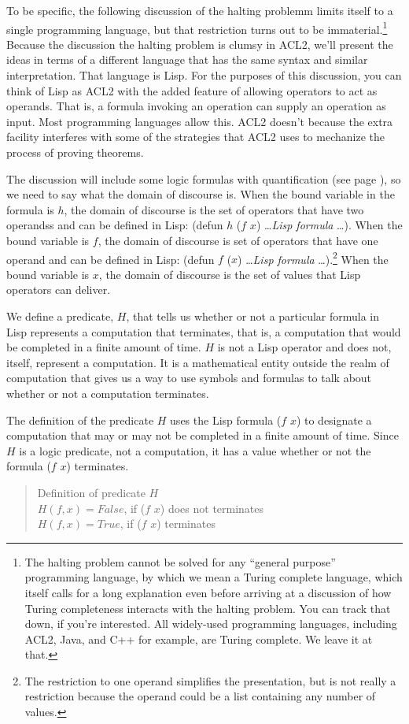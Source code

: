 To be specific, the following discussion of the halting problemm
limits itself to a single programming language, but
that restriction turns out to be immaterial.\footnote{The
halting problem cannot be solved
for any ``general purpose'' programming language,
by which we mean a Turing complete language,
which itself calls for a long explanation even
before arriving at a discussion of how Turing completeness
interacts with the halting problem.
You can track that down, if you're interested.
All widely-used programming languages,
including ACL2, Java, and C++ for example, are Turing complete.
We leave it at that.}
Because the discussion the halting problem is clumsy in ACL2,
we'll present the ideas in terms of a different
language that has the same syntax
and similar interpretation. That language is Lisp.
For the purposes of this discussion,
you can think of Lisp as ACL2 with the added feature
of allowing operators to act as operands.
That is, a formula invoking an operation can supply
an operation as input.
Most programming languages allow this.
ACL2 doesn't because the extra facility
interferes with some of the strategies that ACL2 uses
to mechanize the process of proving theorems.

The discussion will include some logic formulas with
quantification (see page \pageref{quantify-def}),
so we need to say what the domain of discourse is.
When the bound variable
in the formula is $h$, the domain of discourse
is the set of operators that have
two operandss and can be defined in Lisp:
(defun $h$ ($f$ $x$) \dots \emph{Lisp formula} \dots ).
When the bound variable is $f$,
the domain of discourse is  set of operators
that have one operand and can be defined in Lisp:
(defun $f$ ($x$) \dots \emph{Lisp formula} \dots ).\footnote{The
restriction to one operand simplifies the presentation,
but is not really a restriction because the operand could
be a list containing any number of values.}
When the bound variable is $x$, the domain of discourse
is the set of values that Lisp operators can deliver.

We define a predicate, $H$, that tells us whether or not
a particular formula in Lisp represents a computation that terminates,
that is, a computation that would be completed in a finite amount of time.
$H$ is not a Lisp operator and does not, itself,
represent a computation. It is a mathematical entity
outside the realm of computation that gives us a way
to use symbols and formulas to talk about
whether or not a computation terminates.

The definition of the predicate $H$ uses the Lisp
formula ($f$ $x$) to designate a computation that may
or may not be completed in a finite amount of time.
Since $H$ is a logic predicate, not a computation,
it has a value whether or not the formula ($f$ $x$) terminates.
\begin{quote}
\label{def:predicate-H}
Definition of predicate $H$\\
$H(f, x) = False$, if ($f$ $x$) does not terminates\\
$H(f, x) = True$, if ($f$ $x$) terminates
\end{quote}

